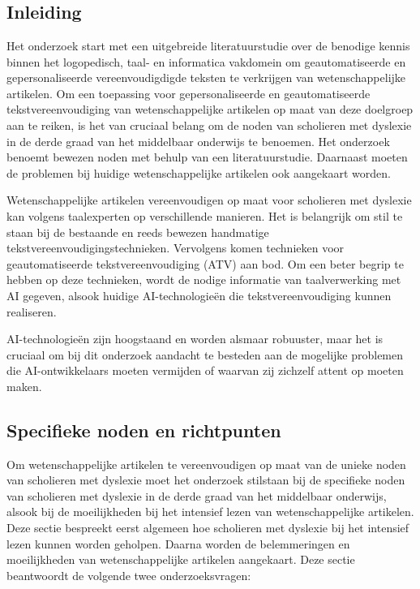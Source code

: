 \chapter{}%
\label{ch:stand-van-zaken}

\section{Inleiding}

Het onderzoek start met een uitgebreide literatuurstudie over de benodige kennis binnen het logopedisch, taal- en informatica vakdomein om geautomatiseerde en gepersonaliseerde vereenvoudigdigde teksten te verkrijgen van wetenschappelijke artikelen. Om een toepassing voor gepersonaliseerde en geautomatiseerde tekstvereenvoudiging van wetenschappelijke artikelen  op maat van deze doelgroep aan te reiken, is het van cruciaal belang om de noden van scholieren met dyslexie in de derde graad van het middelbaar onderwijs te benoemen. Het onderzoek benoemt bewezen noden met behulp van een literatuurstudie. Daarnaast moeten de problemen bij huidige wetenschappelijke artikelen ook aangekaart worden. 

\medspace

Wetenschappelijke artikelen vereenvoudigen op maat voor scholieren met dyslexie kan volgens taalexperten op verschillende manieren. Het is belangrijk om stil te staan bij de bestaande en reeds bewezen handmatige tekstvereenvoudigingstechnieken. Vervolgens komen technieken voor geautomatiseerde tekstvereenvoudiging (ATV) aan bod. Om een beter begrip te hebben op deze technieken, wordt de nodige informatie van taalverwerking met AI gegeven, alsook huidige AI-technologieën die tekstvereenvoudiging kunnen realiseren.

\medspace

AI-technologieën zijn hoogstaand en worden alsmaar robuuster, maar het is cruciaal om bij dit onderzoek aandacht te besteden aan de mogelijke problemen die AI-ontwikkelaars moeten vermijden of waarvan zij zichzelf attent op moeten maken. 

\section{Specifieke noden en richtpunten}

Om wetenschappelijke artikelen te vereenvoudigen op maat van de unieke noden van scholieren met dyslexie moet het onderzoek stilstaan bij de specifieke noden van scholieren met dyslexie in de derde graad van het middelbaar onderwijs, alsook bij de moeilijkheden bij het intensief lezen van wetenschappelijke artikelen. Deze sectie bespreekt eerst algemeen hoe scholieren met dyslexie bij het intensief lezen kunnen worden geholpen. Daarna worden de belemmeringen en moeilijkheden van wetenschappelijke artikelen aangekaart. Deze sectie beantwoordt de volgende twee onderzoeksvragen: 

